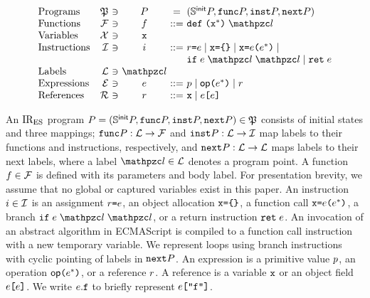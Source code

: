 \documentclass[10pt,conference]{IEEEtran}
\begin{document}
\[
  \begin{array}{lr@{~}c@{~}c@{~}c@{~}l}
    \text{Programs} & \progset &\ni& \prog &=& (\initstset{\prog},
    \getfunc{\prog}, \getinst{\prog}, \getnext{\prog})\\

    \text{Functions} & \funcset &\ni& \func &::=&
    \kwdef \; \kwrl \varx^* \kwrr \; \lab\\

    \text{Variables} & \varset &\ni& \varx\\

    \text{Instructions} & \instset &\ni& \inst &::=&
    \refer \kweq \expr \mid
    \varx \kweq \kwcl \kwcr \mid
    \varx \kweq \expr \kwrl \expr^* \kwrr \mid \\&&&&&
    \kwif \; \expr \; \lab \; \lab \mid
    \kwret \; \expr\\

    \text{Labels} & \labset &\ni& \lab\\

    \text{Expressions} & \exprset &\ni& \expr &::=&
    \pval \mid
    \op \kwrl \expr^* \kwrr \mid
    \refer\\

    \text{References} & \referset &\ni& \refer &::=&
    \varx \mid \expr \kwsl \expr \kwsr\\
  \end{array}
\]

An $\text{IR}_\text{ES}$ program $\prog = (\initstset{\prog}, \getfunc{\prog},
\getinst{\prog}, \getnext{\prog}) \in \progset $ consists of initial states and
three mappings; $\getfunc{\prog}: \labset \rightarrow \funcset$ and
$\getinst{\prog}: \labset \rightarrow \instset$ map labels to their functions
and instructions, respectively, and $\getnext{\prog}: \labset \rightarrow
\labset$ maps labels to their next labels, where a label $\lab \in \labset$
denotes a program point.  A function $f \in \mathcal{F}$ is defined with its
parameters and body label.  For presentation brevity, we assume that no global
or captured variables exist in this paper.  An instruction $i \in \mathcal{I}$
is an assignment $\refer \kweq \expr$, an object allocation $\varx \kweq \kwcl
\kwcr$, a function call $\varx \kweq \expr \kwrl \expr^* \kwrr$, a branch $\kwif
\; \expr \; \lab \; \lab$, or a return instruction $\kwret \; \expr$.  An
invocation of an abstract algorithm in ECMAScript is compiled to a function call
instruction with a new temporary variable.  We represent loops using branch
instructions with cyclic pointing of labels in $\getnext{\prog}$.  An expression
is a primitive value $p$, an operation $\op \kwrl \expr^* \kwrr$, or a
reference $r$.  A reference is a variable $\varx$ or an object field $\expr
\kwsl \expr \kwsr$.  We write $\expr.\varf$ to briefly represent $\expr \kwsl
\code{"f"} \kwsr$.
\end{document}
